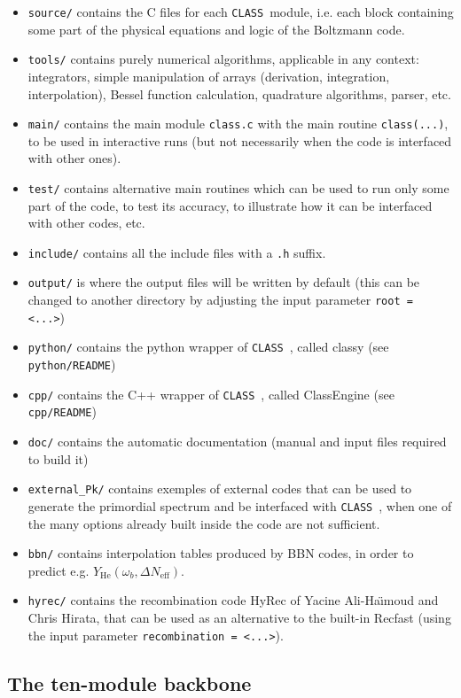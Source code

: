 \documentclass{article}
\newcommand\CLASS{{\tt CLASS}~}
\begin{document}
\begin{itemize} 
\item
{\tt source/} contains the C files for each \CLASS module, i.e. each
block containing some part of the physical equations and logic of
the Boltzmann code.
\item
{\tt tools/} contains purely numerical algorithms, applicable in any
context: integrators, simple manipulation of arrays (derivation,
integration, interpolation), Bessel function calculation, quadrature algorithms, parser, etc.
\item {\tt main/} contains the main module {\tt class.c} with the main
  routine {\tt class(...)}, to be used in interactive runs (but not
  necessarily when the code is interfaced with other ones).
\item
{\tt test/} contains alternative main routines which can be used to
run only some part of the code, to test its accuracy, to illustrate how
it can be interfaced with other codes, etc.
\item
{\tt include/} contains all the include files with a {\tt .h} suffix.
\item
{\tt   output/} is where the output files will be written by default (this can be changed to another directory by adjusting the input parameter {\tt root = <...>})
\item
{\tt   python/} contains the python wrapper of \CLASS, called classy (see {\tt python/README}) 
\item
{\tt   cpp/} contains the C++ wrapper of \CLASS, called ClassEngine (see {\tt cpp/README}) 
\item
{\tt   doc/} contains the automatic documentation (manual and input files required to build it)
\item
{\tt   external\_Pk/} contains exemples of external codes that can be used to generate the primordial spectrum and be interfaced with \CLASS, when one of the many options already built inside the code are not sufficient.
\item
{\tt bbn/} contains interpolation tables produced by BBN codes, in order to predict e.g. $Y_\mathrm{He}(\omega_b, \Delta N_\mathrm{eff})$.
\item
{\tt   hyrec/} contains the recombination code HyRec of Yacine Ali-Ha\"{\i}moud and Chris Hirata, that can be used as an alternative to the built-in Recfast (using the input parameter {\tt recombination = <...>}).
\end{itemize}

\subsection{The ten-module backbone}
\end{document}
